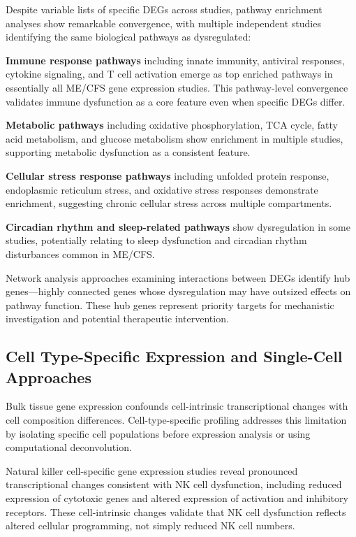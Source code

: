 \begin{observation}
Despite variable lists of specific DEGs across studies, pathway enrichment analyses show remarkable convergence, with multiple independent studies identifying the same biological pathways as dysregulated:

\textbf{Immune response pathways} including innate immunity, antiviral responses, cytokine signaling, and T cell activation emerge as top enriched pathways in essentially all ME/CFS gene expression studies. This pathway-level convergence validates immune dysfunction as a core feature even when specific DEGs differ.

\textbf{Metabolic pathways} including oxidative phosphorylation, TCA cycle, fatty acid metabolism, and glucose metabolism show enrichment in multiple studies, supporting metabolic dysfunction as a consistent feature.

\textbf{Cellular stress response pathways} including unfolded protein response, endoplasmic reticulum stress, and oxidative stress responses demonstrate enrichment, suggesting chronic cellular stress across multiple compartments.

\textbf{Circadian rhythm and sleep-related pathways} show dysregulation in some studies, potentially relating to sleep dysfunction and circadian rhythm disturbances common in ME/CFS.

Network analysis approaches examining interactions between DEGs identify hub genes---highly connected genes whose dysregulation may have outsized effects on pathway function. These hub genes represent priority targets for mechanistic investigation and potential therapeutic intervention.
\end{observation}

\subsection{Cell Type-Specific Expression and Single-Cell Approaches}

Bulk tissue gene expression confounds cell-intrinsic transcriptional changes with cell composition differences. Cell-type-specific profiling addresses this limitation by isolating specific cell populations before expression analysis or using computational deconvolution.

Natural killer cell-specific gene expression studies reveal pronounced transcriptional changes consistent with NK cell dysfunction, including reduced expression of cytotoxic genes and altered expression of activation and inhibitory receptors. These cell-intrinsic changes validate that NK cell dysfunction reflects altered cellular programming, not simply reduced NK cell numbers.

